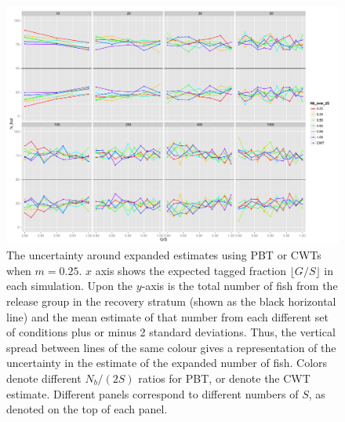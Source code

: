 \documentclass[11pt]{article}
\begin{document}
\begin{figure}
\includegraphics[width = .93\textwidth]{./images/sd_line_horns_m_0_25.pdf}
\caption{The uncertainty around expanded estimates using PBT or CWTs when $m = 0.25$.  $x$ axis shows the
expected tagged fraction $\lfloor G/S \rfloor$ in each simulation. Upon the $y$-axis is the total number of fish from the
release group in the recovery stratum (shown as the black horizontal line) and the mean estimate of that number from each different set of 
conditions plus or minus 2 standard deviations.  Thus, the vertical spread between lines of the same colour gives a representation
of the uncertainty in the estimate of the expanded number of fish. Colors denote different $N_b/(2S)$ ratios for PBT, or denote
the CWT estimate.  Different
panels correspond to different numbers of $S$, as denoted on the top of each panel.
\label{fig:horn0.25}}
\end{figure}
\end{document}
